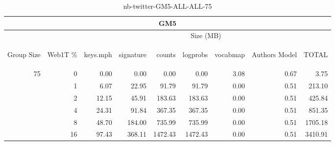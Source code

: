 \begin{center}
\begin{table}[htbp]
\begin{tabular}{ | r | r | r | r | r | r | r | r | r |}
\hline
\multicolumn{9}{|c|}{GM5}\\
\hline
 & & \multicolumn{7}{|c|}{Size (MB)}\\ \cline{3-9}
\begin{sideways}Group Size\end{sideways} & \begin{sideways}Web1T \% \end{sideways} & \begin{sideways}keys.mph\end{sideways} & \begin{sideways}signature\end{sideways} & \begin{sideways}counts\end{sideways} & \begin{sideways}logprobs\end{sideways} & \begin{sideways}vocabmap\end{sideways} & \begin{sideways}Authors Model \end{sideways} & \begin{sideways}TOTAL\end{sideways}\\
\hline
\multirow{5}{*}{75}
 & 0 & 0.00 & 0.00 & 0.00 & 0.00 & 3.08 & 0.67 & 3.75\\ \cline{2-9}
 & 1 & 6.07 & 22.95 & 91.79 & 91.79 & 0.00 & 0.51 & 213.10\\ \cline{2-9}
 & 2 & 12.15 & 45.91 & 183.63 & 183.63 & 0.00 & 0.51 & 425.84\\ \cline{2-9}
 & 4 & 24.31 & 91.84 & 367.35 & 367.35 & 0.00 & 0.51 & 851.35\\ \cline{2-9}
 & 8 & 48.70 & 184.00 & 735.99 & 735.99 & 0.00 & 0.51 & 1705.18\\ \cline{2-9}
 & 16 & 97.43 & 368.11 & 1472.43 & 1472.43 & 0.00 & 0.51 & 3410.91\\ \cline{2-9}
\hline
\end{tabular}
\caption{nb-twitter-GM5-ALL-ALL-75}
\label{table:nb-twitter-GM5-ALL-ALL-75}
\end{table}
\end{center}

